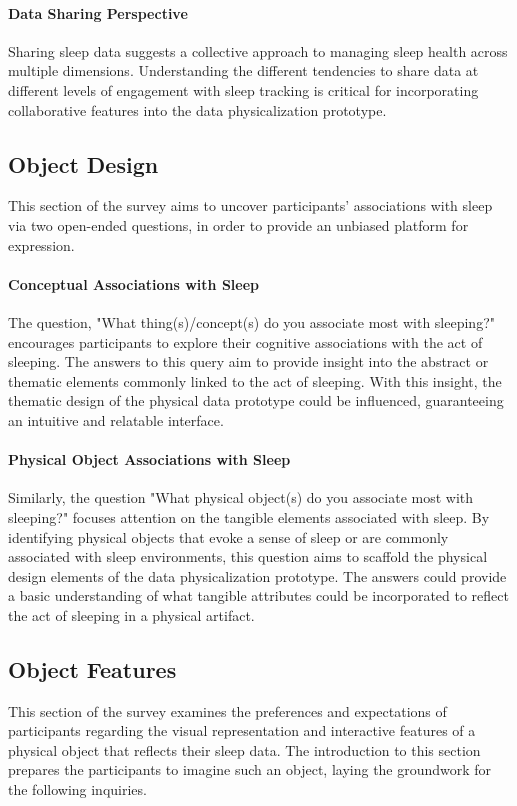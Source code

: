 \documentclass[
  a4paper,  %
  twoside,  %
  bibliography=totoc,
  headsepline,
  cleardoublepage=empty,
  parskip=half,
  draft=false
]{scrbook}
\begin{document}
\paragraph{Data Sharing Perspective}
Sharing sleep data suggests a collective approach to managing sleep health across multiple dimensions. Understanding the different tendencies to share data at different levels of engagement with sleep tracking is critical for incorporating collaborative features into the data physicalization prototype.

\subsection{Object Design}
This section of the survey aims to uncover participants' associations with sleep via two open-ended questions, in order to provide an unbiased platform for expression.
\paragraph{Conceptual Associations with Sleep}
The question, "What thing(s)/concept(s) do you associate most with sleeping?" encourages participants to explore their cognitive associations with the act of sleeping. The answers to this query aim to provide insight into the abstract or thematic elements commonly linked to the act of sleeping. With this insight, the thematic design of the physical data prototype could be influenced, guaranteeing an intuitive and relatable interface.
\paragraph{Physical Object Associations with Sleep}
Similarly, the question "What physical object(s) do you associate most with sleeping?" focuses attention on the tangible elements associated with sleep. By identifying physical objects that evoke a sense of sleep or are commonly associated with sleep environments, this question aims to scaffold the physical design elements of the data physicalization prototype. The answers could provide a basic understanding of what tangible attributes could be incorporated to reflect the act of sleeping in a physical artifact.
\subsection{Object Features}
This section of the survey examines the preferences and expectations of participants regarding the visual representation and interactive features of a physical object that reflects their sleep data. The introduction to this section prepares the participants to imagine such an object, laying the groundwork for the following inquiries.
\end{document}
